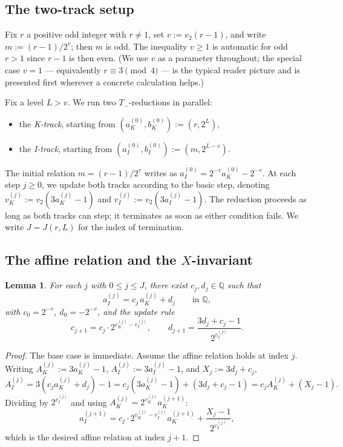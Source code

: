 \documentclass[11pt,reqno]{amsart}
\theoremstyle{plain}
\newtheorem{lemma}[theorem]{Lemma}
\theoremstyle{definition}
\theoremstyle{remark}
\newcommand{\Tminus}{T_{-}}
\newcommand{\Q}{\mathbb{Q}}
\newcommand{\vk}{v_{K}}
\newcommand{\vi}{v_{I}}
\newcommand{\vtwo}{v_{2}}
\begin{document}
\subsection{The two-track setup}

Fix $r$ a positive odd integer with $r \ne 1$, set $v := \vtwo(r-1)$,
and write $m := (r - 1)/2^v$; then $m$ is odd. The inequality $v \ge 1$
is automatic for odd $r > 1$ since $r - 1$ is then even. (We use $v$ as
a parameter throughout; the special case $v = 1$ — equivalently
$r \equiv 3 \pmod 4$ — is the typical reader picture and is presented
first wherever a concrete calculation helps.)

Fix a level $L > v$. We run two $\Tminus$-reductions in parallel:
\begin{itemize}
\item the \emph{K-track}, starting from $(a_K^{(0)}, b_K^{(0)}) := (r, 2^L)$,
\item the \emph{I-track}, starting from $(a_I^{(0)}, b_I^{(0)}) := (m, 2^{L-v})$.
\end{itemize}
The initial relation $m = (r-1)/2^v$ writes as $a_I^{(0)} = 2^{-v} a_K^{(0)} - 2^{-v}$.
At each step $j \ge 0$, we update both tracks according to the basic step,
denoting $\vk^{(j)} := \vtwo(3 a_K^{(j)} - 1)$ and $\vi^{(j)} := \vtwo(3 a_I^{(j)} - 1)$.
The reduction proceeds as long as both tracks can step; it terminates as
soon as either condition fails. We write $J = J(r, L)$ for the index of
termination.

\subsection{The affine relation and the \texorpdfstring{$X$}{X}-invariant}

\begin{lemma}\label{lem:affine}
For each $j$ with $0 \le j \le J$, there exist $c_j, d_j \in \Q$ such that
\[
a_I^{(j)} = c_j \, a_K^{(j)} + d_j \qquad \text{in } \Q,
\]
with $c_0 = 2^{-v}$, $d_0 = -2^{-v}$, and the update rule
\[
c_{j+1} = c_j \cdot 2^{\vk^{(j)} - \vi^{(j)}}, \qquad
d_{j+1} = \frac{3 d_j + c_j - 1}{2^{\vi^{(j)}}}.
\]
\end{lemma}

\begin{proof}
The base case is immediate. Assume the affine relation holds at index $j$.
Writing $A_K^{(j)} := 3 a_K^{(j)} - 1$, $A_I^{(j)} := 3 a_I^{(j)} - 1$, and
$X_j := 3 d_j + c_j$,
\[
A_I^{(j)} = 3(c_j a_K^{(j)} + d_j) - 1 = c_j (3 a_K^{(j)} - 1) + (3 d_j + c_j - 1) = c_j A_K^{(j)} + (X_j - 1).
\]
Dividing by $2^{\vi^{(j)}}$ and using $A_K^{(j)} = 2^{\vk^{(j)}} a_K^{(j+1)}$:
\[
a_I^{(j+1)} = c_j \cdot 2^{\vk^{(j)} - \vi^{(j)}} a_K^{(j+1)} + \frac{X_j - 1}{2^{\vi^{(j)}}},
\]
which is the desired affine relation at index $j+1$. \qedhere
\end{proof}
\end{document}
